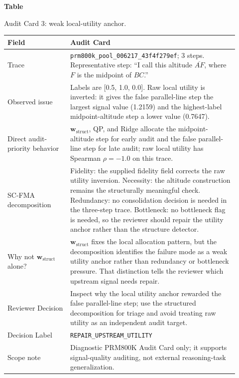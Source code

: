 \documentclass[a4paper,fleqn]{cas-sc}
\newcommand{\wstruct}{\ensuremath{\mathbf{w}_{\mathrm{struct}}}}
\begin{document}
\par\medskip
{}\label{tab:audit-card-utility}
\noindent\textbf{Table~\thetable}\par
\noindent Audit Card 3: weak local-utility anchor.
\begin{center}
\small
\renewcommand{\arraystretch}{1.08}
\begin{tabular}{p{0.25\linewidth}p{0.67\linewidth}}
\toprule
\textbf{Field} & \textbf{Audit Card} \\
\midrule
Trace & \texttt{prm800k\_pool\_006217\_43f4f279ef}; 3 steps. Representative step: ``I call this altitude $\overline{AF}$, where $F$ is the midpoint of $BC$.'' \\
Observed issue & Labels are [0.5, 1.0, 0.0]. Raw local utility is inverted: it gives the false parallel-line step the largest signal value (1.2159) and the highest-label midpoint-altitude step a lower value (0.7647). \\
Direct audit-priority behavior & \wstruct{}, QP, and Ridge allocate the midpoint-altitude step for early audit and the false parallel-line step for late audit; raw local utility has Spearman $\rho=-1.0$ on this trace. \\
SC-FMA decomposition & Fidelity: the supplied fidelity field corrects the raw utility inversion. Necessity: the altitude construction remains the structurally meaningful check. Redundancy: no consolidation decision is needed in the three-step trace. Bottleneck: no bottleneck flag is needed, so the reviewer should repair the utility anchor rather than the structure detector. \\
Why not \wstruct{} alone? & \wstruct{} fixes the local allocation pattern, but the decomposition identifies the failure mode as a weak utility anchor rather than redundancy or bottleneck pressure. That distinction tells the reviewer which upstream signal needs repair. \\
Reviewer Decision & Inspect why the local utility anchor rewarded the false parallel-line step; use the structured decomposition for triage and avoid treating raw utility as an independent audit target. \\
Decision Label & \texttt{REPAIR\_UPSTREAM\_UTILITY} \\
Scope note & Diagnostic PRM800K Audit Card only; it supports signal-quality auditing, not external reasoning-task generalization. \\
\bottomrule
\end{tabular}
\end{center}
\medskip
\end{document}
